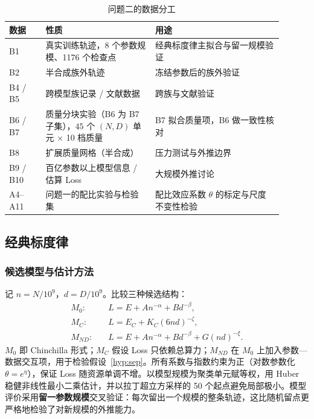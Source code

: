 \begin{table}[htbp]
\centering
\small
\caption{问题二的数据分工}
\label{tab:p2_data}
\begin{tabular}{p{0.12\linewidth}p{0.36\linewidth}p{0.42\linewidth}}
\toprule
数据 & 性质 & 用途 \\
\midrule
B1 & 真实训练轨迹，8 个参数规模、1176 个检查点 & 经典标度律主拟合与留一规模验证 \\
B2 & 半合成族外轨迹 & 冻结参数后的族外验证 \\
B4 / B5 & 跨模型族记录 / 文献数据 & 跨族与文献验证 \\
B6 / B7 & 质量分块实验（B6 为 B7 子集），$45$ 个 $(N,D)$ 单元 × 10 档质量 & B7 拟合质量项，B6 做一致性核对 \\
B8 & 扩展质量网格（半合成） & 压力测试与外推边界 \\
B9 / B10 & 百亿参数以上模型信息 / 估算 Loss & 大规模外推讨论 \\
A4--A11 & 问题一的配比实验与检验集 & 配比效应系数 $\theta$ 的标定与尺度不变性检验 \\
\bottomrule
\end{tabular}
\end{table}

\subsection{经典标度律}
\label{sec:p2_classic}

\subsubsection{候选模型与估计方法}

记 $n=N/10^9$，$d=D/10^9$。比较三种候选结构：
\begin{align}
M_0:&\quad L=E+An^{-\alpha}+Bd^{-\beta}, \label{eq:p2_m0}\\
M_C:&\quad L=E_C+K_C(6nd)^{-\zeta}, \label{eq:p2_mc}\\
M_{ND}:&\quad L=E+An^{-\alpha}+Bd^{-\beta}+G(nd)^{-\xi}. \label{eq:p2_mnd}
\end{align}
$M_0$ 即 Chinchilla 形式\cite{hoffmann2022compute}；$M_C$ 假设 Loss 只依赖总算力\cite{kaplan2020scaling}；$M_{ND}$ 在 $M_0$ 上加入参数—数据交互项，用于检验假设~\ref{hyp:sep}。所有系数与指数约束为正（对数参数化 $\theta=e^{\eta}$），保证 Loss 随资源单调不增。以模型规模为聚类单元赋等权，用 Huber 稳健非线性最小二乘估计，并以拉丁超立方采样的 50 个起点避免局部极小。模型评价采用\textbf{留一参数规模}交叉验证：每次留出一个规模的整条轨迹，这比随机留点更严格地检验了对新规模的外推能力。

